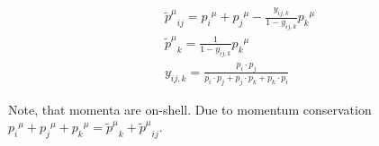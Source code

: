 \begin{equation}
\begin{split}
&{\tilde{p}^{\mu}}_{ij} = {p_i}^{\mu}+{p_j}^{\mu}-\frac{y_{ij,k}}{1-y_{ij,k}}{p_k}^{\mu}\\
&{\tilde{p}^{\mu}}_{k} = \frac{1}{1-y_{ij,k}}{p_k}^{\mu}\\
&y_{ij,k}=\frac{p_i \cdot p_j}{p_i \cdot p_j+p_j \cdot p_k+p_k \cdot p_i}
\end{split}
\end{equation}

Note, that momenta are on-shell. Due to momentum conservation\\ ${p_i}^{\mu}+{p_j}^{\mu}+{p_k}^{\mu}= {\tilde{p}^{\mu}}_{k} +{\tilde{p}^{\mu}}_{ij} $. 
